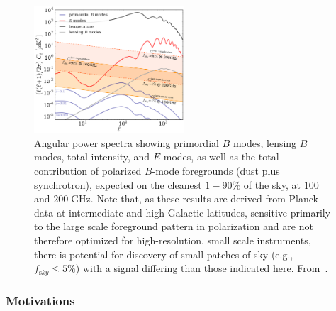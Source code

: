 \begin{figure}[htbp]
\centering
\includegraphics[width=0.5\textwidth]{Analysis/Power_Spectrum_figure_showing_foregrounds.pdf}
\caption{Angular power spectra showing primordial $B$ modes, lensing $B$ modes, total intensity, and $E$ modes, as well as the total contribution of polarized $B$-mode foregrounds (dust plus synchrotron), expected on the cleanest $1-90\%$ of the sky, at $100$ and $200\;$GHz. Note that, as these results are derived from Planck data at intermediate and high Galactic latitudes, sensitive primarily to the large scale 
foreground pattern in polarization and are not therefore optimized for high-resolution, small scale instruments, there is potential for discovery of small patches of sky (e.g., $f_{\mathrm sky} \leq 5\%$) with a signal differing than those indicated here. From~\cite{errard15b}.}
\label{fig:power_spectrum_fgs}
\end{figure}


\subsubsection{Motivations}


